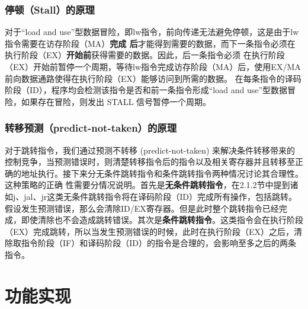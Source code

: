 \subsubsection{停顿（Stall）的原理}
对于“load and use”型数据冒险，即lw指令，前向传递无法避免停顿，这是由于lw指令需要在访存阶段（MA）\textbf{完成
后}才能得到需要的数据，而下一条指令必须在执行阶段（EX）\textbf{开始前}获得需要的数据。因此，后一条指令必须
在执行阶段（EX）开始前暂停一个周期，等待lw指令完成访存阶段（MA）后，使用EX/MA前向数据通路使得在执行阶段（EX）能够访问到所需的数据。
在每条指令的译码阶段（ID），程序均会检测该指令是否和前一条指令形成“load and use”型数据冒险，如果存在冒险，则发出 STALL 信号暂停一个周期。

\subsubsection{转移预测（predict-not-taken）的原理}
对于跳转指令，我们通过预测不转移 (predict-not-taken) 来解决条件转移带来的控制竞争，当预测错误时，则清楚转移指令后的指令以及相关寄存器并且转移至正确的地址执行。接下来分无条件跳转指令和条件跳转指令两种情况讨论其合理性。这种策略的正确
性需要分情况说明。首先是\textbf{无条件跳转指令}，在2.1.2节中提到诸如j、jal、jr这类无条件跳转指令将在译码阶段（ID）完成所有操作，包括跳转。假设发生预测错误，那么会清除ID/EX寄存器。但是此时整个跳转指令已经完成，即使清除也不会造成跳转错误。其次是\textbf{条件跳转指令}。这类指令会在执行阶段（EX）完成跳转，所以当发生预测错误的时候，此时在执行阶段（EX）之后，清除取指令阶段（IF）和译码阶段（ID）的指令是合理的，会影响至多之后的两条指令。

\section{功能实现}

